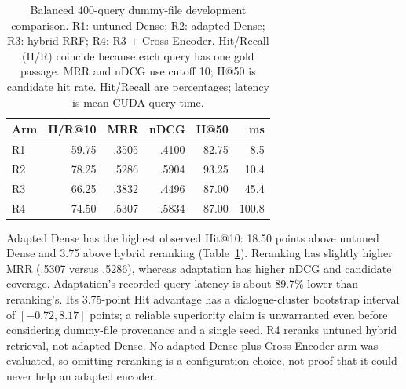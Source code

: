 \begin{table}[t]
\centering\small
\setlength{\tabcolsep}{3.5pt}
\begin{tabular}{lrrrrr}
\toprule
Arm & H/R@10 & MRR & nDCG & H@50 & ms\\
\midrule
R1 & 59.75 & .3505 & .4100 & 82.75 & 8.5\\
R2 & 78.25 & .5286 & .5904 & 93.25 & 10.4\\
R3 & 66.25 & .3832 & .4496 & 87.00 & 45.4\\
R4 & 74.50 & .5307 & .5834 & 87.00 & 100.8\\
\bottomrule
\end{tabular}
\caption{Balanced 400-query dummy-file development comparison. R1: untuned Dense; R2: adapted Dense; R3: hybrid RRF; R4: R3 + Cross-Encoder. Hit/Recall (H/R) coincide because each query has one gold passage. MRR and nDCG use cutoff 10; H@50 is candidate hit rate. Hit/Recall are percentages; latency is mean CUDA query time.}
\label{tab:retrieval-adaptation}
\end{table}

Adapted Dense has the highest observed Hit@10: 18.50 points above untuned Dense and 3.75 above hybrid reranking (Table~\ref{tab:retrieval-adaptation}). Reranking has slightly higher MRR (.5307 versus .5286), whereas adaptation has higher nDCG and candidate coverage. Adaptation's recorded query latency is about 89.7\% lower than reranking's. Its 3.75-point Hit advantage has a dialogue-cluster bootstrap interval of $[-0.72,8.17]$ points; a reliable superiority claim is unwarranted even before considering dummy-file provenance and a single seed.
R4 reranks untuned hybrid retrieval, not adapted Dense. No adapted-Dense-plus-Cross-Encoder arm was evaluated, so omitting reranking is a configuration choice, not proof that it could never help an adapted encoder.
